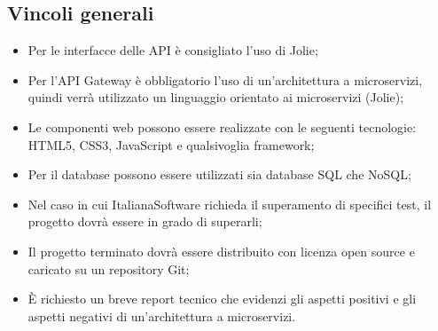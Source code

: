 \subsection{Vincoli generali}
\begin{itemize}
\item Per le interfacce delle API è consigliato l'uso di Jolie;
\item Per l'API Gateway è obbligatorio l'uso di un'architettura a microservizi, quindi verrà utilizzato un linguaggio orientato ai microservizi (Jolie);
\item Le componenti web possono essere realizzate con le seguenti tecnologie: HTML5, CSS3, JavaScript e qualsivoglia framework;
\item Per il database possono essere utilizzati sia database SQL che NoSQL;
\item Nel caso in cui ItalianaSoftware richieda il superamento di specifici test, il progetto dovrà essere in grado di superarli;
\item Il progetto terminato dovrà essere distribuito con licenza open source e caricato su un repository Git;
\item \MakeUppercase{è} richiesto un breve report tecnico che evidenzi gli aspetti positivi e gli aspetti negativi di un'architettura a microservizi.
\end{itemize}
